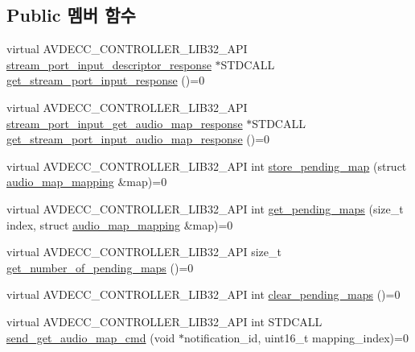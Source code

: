 \subsection*{Public 멤버 함수}
\begin{DoxyCompactItemize}
\item 
virtual A\+V\+D\+E\+C\+C\+\_\+\+C\+O\+N\+T\+R\+O\+L\+L\+E\+R\+\_\+\+L\+I\+B32\+\_\+\+A\+PI \hyperlink{classavdecc__lib_1_1stream__port__input__descriptor__response}{stream\+\_\+port\+\_\+input\+\_\+descriptor\+\_\+response} $\ast$S\+T\+D\+C\+A\+LL \hyperlink{classavdecc__lib_1_1stream__port__input__descriptor_af310caba5e55b84e2c04cf5c2dfb77f6}{get\+\_\+stream\+\_\+port\+\_\+input\+\_\+response} ()=0
\item 
virtual A\+V\+D\+E\+C\+C\+\_\+\+C\+O\+N\+T\+R\+O\+L\+L\+E\+R\+\_\+\+L\+I\+B32\+\_\+\+A\+PI \hyperlink{classavdecc__lib_1_1stream__port__input__get__audio__map__response}{stream\+\_\+port\+\_\+input\+\_\+get\+\_\+audio\+\_\+map\+\_\+response} $\ast$S\+T\+D\+C\+A\+LL \hyperlink{classavdecc__lib_1_1stream__port__input__descriptor_a5b79f01c24a0d25900ce351c21cfada3}{get\+\_\+stream\+\_\+port\+\_\+input\+\_\+audio\+\_\+map\+\_\+response} ()=0
\item 
virtual A\+V\+D\+E\+C\+C\+\_\+\+C\+O\+N\+T\+R\+O\+L\+L\+E\+R\+\_\+\+L\+I\+B32\+\_\+\+A\+PI int \hyperlink{classavdecc__lib_1_1stream__port__input__descriptor_ac1774e84412c74378819f20d257a7653}{store\+\_\+pending\+\_\+map} (struct \hyperlink{structavdecc__lib_1_1audio__map__mapping}{audio\+\_\+map\+\_\+mapping} \&map)=0
\item 
virtual A\+V\+D\+E\+C\+C\+\_\+\+C\+O\+N\+T\+R\+O\+L\+L\+E\+R\+\_\+\+L\+I\+B32\+\_\+\+A\+PI int \hyperlink{classavdecc__lib_1_1stream__port__input__descriptor_aaa56e01b09f3ff3f29037216607e556e}{get\+\_\+pending\+\_\+maps} (size\+\_\+t index, struct \hyperlink{structavdecc__lib_1_1audio__map__mapping}{audio\+\_\+map\+\_\+mapping} \&map)=0
\item 
virtual A\+V\+D\+E\+C\+C\+\_\+\+C\+O\+N\+T\+R\+O\+L\+L\+E\+R\+\_\+\+L\+I\+B32\+\_\+\+A\+PI size\+\_\+t \hyperlink{classavdecc__lib_1_1stream__port__input__descriptor_ab97aa51efdb274b6226d04c41f2d974e}{get\+\_\+number\+\_\+of\+\_\+pending\+\_\+maps} ()=0
\item 
virtual A\+V\+D\+E\+C\+C\+\_\+\+C\+O\+N\+T\+R\+O\+L\+L\+E\+R\+\_\+\+L\+I\+B32\+\_\+\+A\+PI int \hyperlink{classavdecc__lib_1_1stream__port__input__descriptor_ad7e55593254a186706fcd8d861ccdef8}{clear\+\_\+pending\+\_\+maps} ()=0
\item 
virtual A\+V\+D\+E\+C\+C\+\_\+\+C\+O\+N\+T\+R\+O\+L\+L\+E\+R\+\_\+\+L\+I\+B32\+\_\+\+A\+PI int S\+T\+D\+C\+A\+LL \hyperlink{classavdecc__lib_1_1stream__port__input__descriptor_a685ec3b997e066fc3530a3cd213f581b}{send\+\_\+get\+\_\+audio\+\_\+map\+\_\+cmd} (void $\ast$notification\+\_\+id, uint16\+\_\+t mapping\+\_\+index)=0

\end{DoxyCompactItemize}
